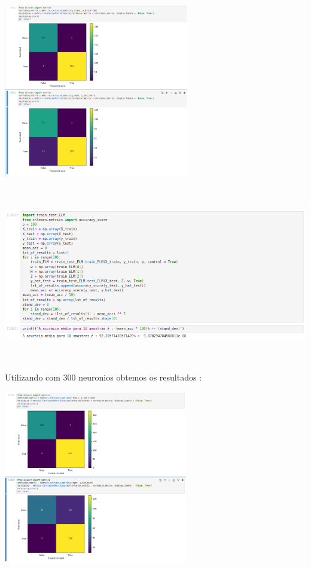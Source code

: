 \documentclass{article}
\begin{document}
\begin{center}
\begin{center}
\includegraphics[height=3in]{Ex6/Breast_Cancer/matrix_conf_100.png}
\vspace{10pt}

\end{center}

\begin{center}

\includegraphics[height=3in]{Ex6/Breast_Cancer/acc_100.png}
\vspace{10pt}

\end{center}



\vspace{5pt}
Utilizando com 300 neuronios obtemos os resultados : 

\begin{center}

\includegraphics[height=3in]{Ex6/Breast_Cancer/matrix_conf_300.png}
\vspace{10pt}


\end{center}
\end{center}
\end{document}
